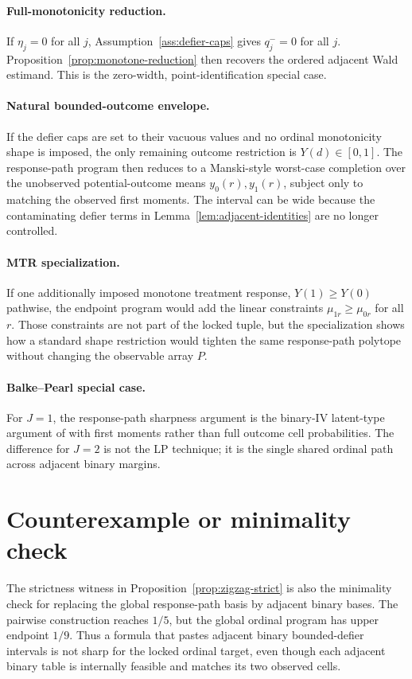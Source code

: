 \documentclass[11pt]{article}
\theoremstyle{definition}
\theoremstyle{plain}
\theoremstyle{remark}
\begin{document}
\paragraph{Full-monotonicity reduction.}
If \(\eta_j=0\) for all \(j\), Assumption~\ref{ass:defier-caps} gives
\(q_j^-=0\) for all \(j\).  Proposition~\ref{prop:monotone-reduction} then
recovers the ordered adjacent Wald estimand.  This is the zero-width,
point-identification special case.

\paragraph{Natural bounded-outcome envelope.}
If the defier caps are set to their vacuous values and no ordinal monotonicity
shape is imposed, the only remaining outcome restriction is \(Y(d)\in[0,1]\).
The response-path program then reduces to a Manski-style worst-case completion
over the unobserved potential-outcome means \(y_0(r),y_1(r)\), subject only to
matching the observed first moments.  The interval can be wide because the
contaminating defier terms in Lemma~\ref{lem:adjacent-identities} are no
longer controlled.

\paragraph{MTR specialization.}
If one additionally imposed monotone treatment response,
\(Y(1)\ge Y(0)\) pathwise, the endpoint program would add the linear
constraints \(\mu_{1r}\ge\mu_{0r}\) for all \(r\).  Those constraints are not
part of the locked tuple, but the specialization shows how a standard shape
restriction would tighten the same response-path polytope without changing the
observable array \(P\).

\paragraph{Balke--Pearl special case.}
For \(J=1\), the response-path sharpness argument is the binary-IV latent-type
argument of \cite{BalkePearl1997} with first moments rather than full outcome
cell probabilities.  The difference for \(J=2\) is not the LP technique; it is
the single shared ordinal path across adjacent binary margins.

\section{Counterexample or minimality check}
The strictness witness in Proposition~\ref{prop:zigzag-strict} is also the
minimality check for replacing the global response-path basis by adjacent
binary bases.  The pairwise construction reaches \(1/5\), but the global
ordinal program has upper endpoint \(1/9\).  Thus a formula that pastes
adjacent binary bounded-defier intervals is not sharp for the locked ordinal
target, even though each adjacent binary table is internally feasible and
matches its two observed cells.
\end{document}
